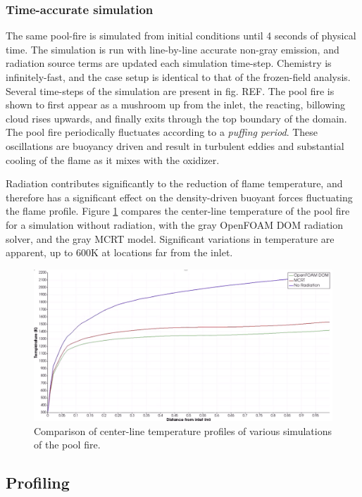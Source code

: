 \subsubsection{Time-accurate simulation}
The same pool-fire is simulated from initial conditions until 4 seconds of physical time.
The simulation is run with line-by-line accurate non-gray emission, and radiation source terms are updated each simulation time-step. Chemistry is infinitely-fast, and the case setup is identical to that of the frozen-field analysis.
Several time-steps of the simulation are present in fig. REF. The pool fire is shown to first appear as a mushroom up from the inlet, the reacting, billowing cloud rises upwards, and finally exits through the top boundary of the domain.
The pool fire periodically fluctuates according to a \textit{puffing period}. These oscillations are buoyancy driven and result in turbulent eddies and substantial cooling of the flame as it mixes with the oxidizer.

Radiation contributes significantly to the reduction of flame temperature, and therefore has a significant effect on the density-driven buoyant forces fluctuating the flame profile. 
Figure \ref{fig:PoolFire_withandwithoutrad} compares the center-line temperature of the pool fire for a simulation without radiation, with the gray OpenFOAM DOM radiation solver, and the gray MCRT model. Significant variations in temperature are apparent, up to $600$K at locations far from the inlet.


\begin{figure}
\centering
\includegraphics[width=1\linewidth]{figures/ch4/PoolFire_WithandWithoutRadiation.png}
\caption{Comparison of center-line temperature profiles of various simulations of the pool fire.}
\label{fig:PoolFire_withandwithoutrad}
\end{figure}

\subsection{Profiling}
